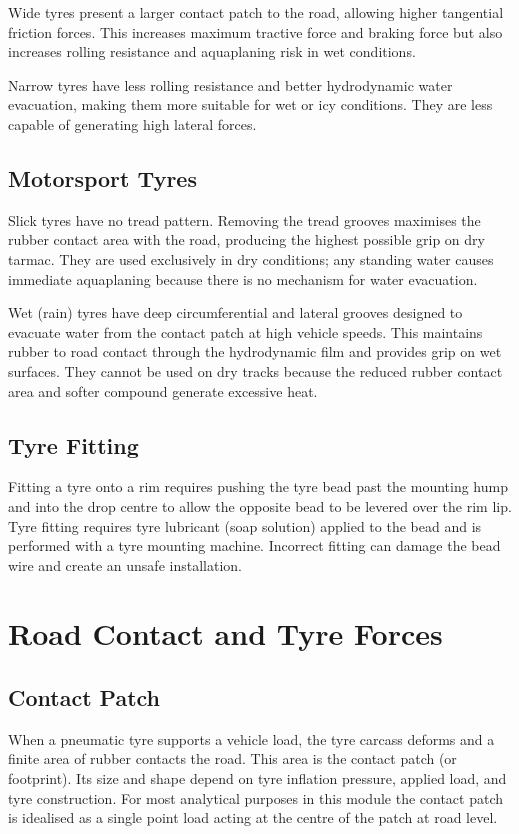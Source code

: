 \documentclass[10pt,a4paper]{article}
\begin{document}
Wide tyres present a larger contact patch to the road, allowing higher tangential friction forces. This increases maximum tractive force and braking force but also increases rolling resistance and aquaplaning risk in wet conditions.

Narrow tyres have less rolling resistance and better hydrodynamic water evacuation, making them more suitable for wet or icy conditions. They are less capable of generating high lateral forces.

\subsection{Motorsport Tyres}

Slick tyres have no tread pattern. Removing the tread grooves maximises the rubber contact area with the road, producing the highest possible grip on dry tarmac. They are used exclusively in dry conditions; any standing water causes immediate aquaplaning because there is no mechanism for water evacuation.

Wet (rain) tyres have deep circumferential and lateral grooves designed to evacuate water from the contact patch at high vehicle speeds. This maintains rubber to road contact through the hydrodynamic film and provides grip on wet surfaces. They cannot be used on dry tracks because the reduced rubber contact area and softer compound generate excessive heat.

\subsection{Tyre Fitting}

Fitting a tyre onto a rim requires pushing the tyre bead past the mounting hump and into the drop centre to allow the opposite bead to be levered over the rim lip. Tyre fitting requires tyre lubricant (soap solution) applied to the bead and is performed with a tyre mounting machine. Incorrect fitting can damage the bead wire and create an unsafe installation.

\section{Road Contact and Tyre Forces}

\subsection{Contact Patch}

When a pneumatic tyre supports a vehicle load, the tyre carcass deforms and a finite area of rubber contacts the road. This area is the contact patch (or footprint). Its size and shape depend on tyre inflation pressure, applied load, and tyre construction. For most analytical purposes in this module the contact patch is idealised as a single point load acting at the centre of the patch at road level.
\end{document}
